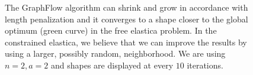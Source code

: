 \begin{figure}

\caption{ The GraphFlow algorithm can shrink and grow in accordance with length penalization and it converges to a shape closer to the global optimum (green curve) in the free elastica problem. In the constrained elastica, we believe that we can improve the results by using a larger, possibly random, neighborhood. We are using $n=2,a=2$ and shapes are displayed at every $10$ iterations.}
\label{ch8:fig:graph-flow-neigh2-results}
\end{figure}

